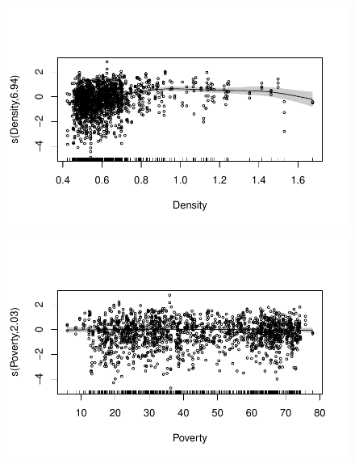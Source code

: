 \documentclass[
  letterpaper,
  DIV=11,
  numbers=noendperiod]{scrartcl}
\begin{document}
\begin{figure}[H]

{\centering \includegraphics{Group34Coursework_files/figure-pdf/unnamed-chunk-16-4.pdf}

}

\end{figure}

\begin{figure}[H]

{\centering \includegraphics{Group34Coursework_files/figure-pdf/unnamed-chunk-16-5.pdf}

}

\end{figure}
\end{document}
